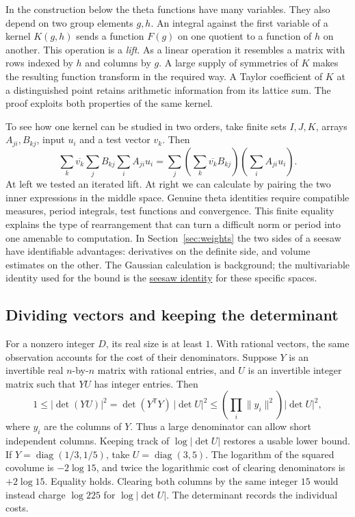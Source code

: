 \documentclass[11pt,letterpaper]{article}
\begin{document}
In the construction below the theta functions have many variables. They also depend on two group elements \(g,h\). An integral against the first variable of a kernel \(K(g,h)\) sends a function \(F(g)\) on one quotient to a function of \(h\) on another. This operation is a \emph{lift}. As a linear operation it resembles a matrix with rows indexed by \(h\) and columns by \(g\). A large supply of symmetries of \(K\) makes the resulting function transform in the required way. A Taylor coefficient of \(K\) at a distinguished point retains arithmetic information from its lattice sum. The proof exploits both properties of the same kernel.

To see how one kernel can be studied in two orders, take finite sets \(I,J,K\), arrays \(A_{ji},B_{kj}\), input \(u_i\) and a test vector \(v_k\). Then
\[
 \sum_k\overline{v_k}\sum_j B_{kj}\sum_i A_{ji}u_i
   =\sum_j\left(\sum_k\overline{v_k}B_{kj}\right)
                 \left(\sum_i A_{ji}u_i\right).
\]
At left we tested an iterated lift. At right we can calculate by pairing the two inner expressions in the middle space. Genuine theta identities require compatible measures, period integrals, test functions and convergence. This finite equality explains the type of rearrangement that can turn a difficult norm or period into one amenable to computation. In Section~\ref{sec:weights} the two sides of a seesaw have identifiable advantages: derivatives on the definite side, and volume estimates on the other. The Gaussian calculation is background; the multivariable identity used for the bound is the \hyperref[sec:derivative]{seesaw identity} for these specific spaces.

\subsection{Dividing vectors and keeping the determinant}
For a nonzero integer \(D\), its real size is at least \(1\). With rational vectors, the same observation accounts for the cost of their denominators. Suppose \(Y\) is an invertible real \(n\)-by-\(n\) matrix with rational entries, and \(U\) is an invertible integer matrix such that \(YU\) has integer entries. Then
\[
  1\leq|\det(YU)|^2
   =\det(Y^{\mathsf T}Y)\,|\det U|^2
   \leq \left(\prod_i\|y_i\|^2\right)|\det U|^2,
\]
where \(y_i\) are the columns of \(Y\). Thus a large denominator can allow short independent columns. Keeping track of \(\log|\det U|\) restores a usable lower bound. If \(Y=\operatorname{diag}(1/3,1/5)\), take \(U=\operatorname{diag}(3,5)\). The logarithm of the squared covolume is \(-2\log15\), and twice the logarithmic cost of clearing denominators is \(+2\log15\). Equality holds. Clearing both columns by the same integer \(15\) would instead charge \(\log225\) for \(\log|\det U|\). The determinant records the individual costs.
\end{document}
